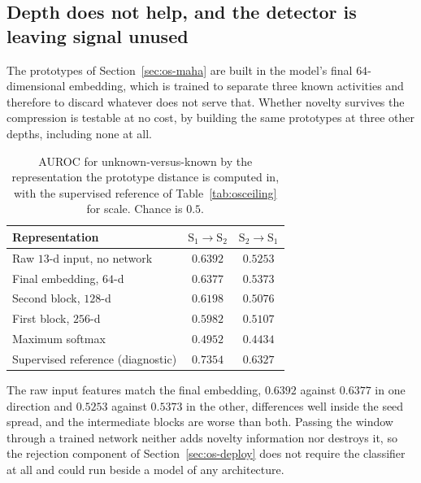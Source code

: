 \subsection{Depth does not help, and the detector is leaving signal unused}
\label{sec:os-depth}

The prototypes of Section~\ref{sec:os-maha} are built in the model's final
$64$-dimensional embedding, which is trained to separate three known activities and
therefore to discard whatever does not serve that. Whether novelty survives the
compression is testable at no cost, by building the same prototypes at three other
depths, including none at all.

\begin{table}[t]
\centering
\caption{AUROC for unknown-versus-known by the representation the prototype distance is
computed in, with the supervised reference of Table~\ref{tab:osceiling} for scale. Chance is
$0.5$.}
\label{tab:osdepth}
\small
\begin{tabular}{@{}lcc@{}}
\toprule
Representation & $\text{S}_1\!\to\!\text{S}_2$ & $\text{S}_2\!\to\!\text{S}_1$ \\
\midrule
Raw $13$-d input, no network & $\mathbf{0.6392}$ & $0.5253$ \\
Final embedding, $64$-d      & $0.6377$ & $\mathbf{0.5373}$ \\
Second block, $128$-d        & $0.6198$ & $0.5076$ \\
First block, $256$-d         & $0.5982$ & $0.5107$ \\
\midrule
Maximum softmax              & $0.4952$ & $0.4434$ \\
Supervised reference (diagnostic)& $0.7354$ & $0.6327$ \\
\bottomrule
\end{tabular}
\end{table}

The raw input features match the final embedding, $0.6392$ against $0.6377$ in one
direction and $0.5253$ against $0.5373$ in the other, differences well inside the seed
spread, and the intermediate blocks are worse than both. Passing the window through a
trained network neither adds novelty information nor destroys it, so the rejection
component of Section~\ref{sec:os-deploy} does not require the classifier at all and could
run beside a model of any architecture.


